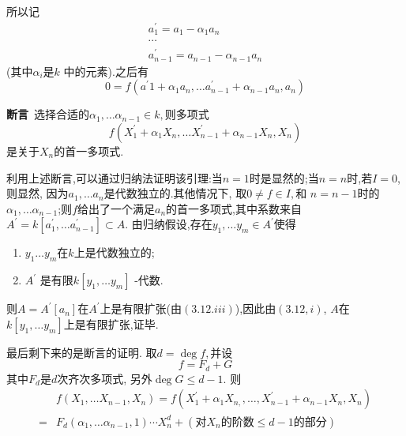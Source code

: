 \documentclass[UTF8]{book}
\begin{document}
		
		
		所以记
		\begin{equation*}
		\begin{array}{c}
		{ a _{1}^{\prime}= a _{1}- \alpha _{1} a _{ n }} \\
		{\cdots} \\
		{ a _{ n -1}^{\prime}= a _{ n -1}- \alpha _{ n -1} a _{ n }}
		\end{array}
		\end{equation*}
		(其中$\alpha_{i}$是$k$ 中的元素).之后有
		\begin{equation*}
		0= f \left(a ^{\prime} 1+\alpha_{1} a _{ n }, \ldots a _{ n -1}^{\prime}+\alpha_{ n -1} a _{ n }, a _{ n }\right)
		\end{equation*}
		
		
		\textbf{断言}\ 选择合适的$\alpha_{1}, \dots \alpha_{n-1} \in k,$则多项式
		\begin{equation*}
		f \left(X _{1}^{\prime}+\alpha_{1} X _{ n},\dots X _{ n -1}^{\prime}+\alpha_{ n -1} X _{ n }, X _{ n }\right)
		\end{equation*}
		是关于$X _{ n }$的首一多项式.
		
		
		利用上述断言,可以通过归纳法证明该引理:当$ n = 1 $时是显然的;当$ n = n $时,若$I=0$,则显然, 因为$a_{1}, \dots a_{n}$是代数独立的.其他情况下, 取$0 \neq f \in I,$和 $ n = n-1 $时的$\alpha_{1}, \ldots \alpha_{n-1}$;则$f$给出了一个满足$ a_{n} $的首一多项式,其中系数来自$A ^{\prime}= k \left[ a _{1}^{\prime}, \ldots a ^{\prime}_{n -1}\right] \subset A .$ 由归纳假设,存在$y_{1}, \dots y_{m} \in A^{\prime}$使得
		
		\begin{enumerate}[(1)]
			\item $y _{1} \ldots y _{ m }$在$k$上是代数独立的;
			\item $A^{\prime}$ 是有限$k \left[y_{1}, \dots y _{m} \right]$ -代数. 
		\end{enumerate}
		
		
		则$A = A ^{\prime}\left[ a _{ n }\right]$在$A ^{\prime}$上是有限扩张(由$ (3.12.iii) $),因此由$(3.12, i )$, $ A $在$k \left[ y _{1}, \ldots y _{ m }\right]$上是有限扩张,证毕.
		
		
		
		最后剩下来的是断言的证明. 取$d =\operatorname{deg} f ,$并设
		\begin{equation*}
		f = F _{ d }+ G
		\end{equation*}
		其中$F _{ d }$是$d$次齐次多项式, 另外$\operatorname{deg} G \leq d -1 .$ 则
		\begin{equation*}
		\begin{split}
		&f\left(X_{1}, \dots X_{n-1}, X_{n}\right)=f\left(X_{1}^{\prime}+\alpha_{1} X_{n, },\ldots, X_{n-1}^{\prime}+\alpha_{n-1} X_{n}, X_{n}\right)\\
		=&F _{ d }\left(\alpha_{1}, \ldots \alpha_{n-1}, 1\right) \cdots X _{ n }^{d} +\left(\text {对} X _{ n } \text {的阶数} \leq d -1\text{的部分}\right)
		\end{split}
		\end{equation*}
		
\end{document}
